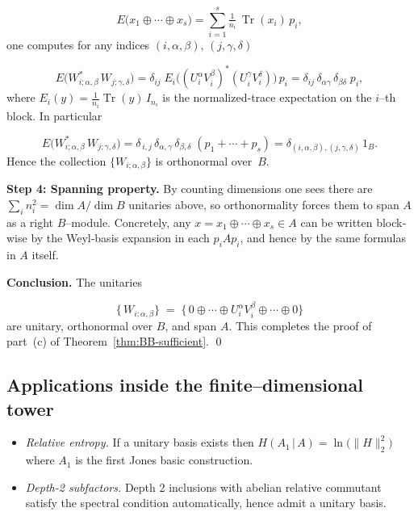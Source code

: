 \documentclass[11pt]{article}
\theoremstyle{mytheoremstyle}
\theoremstyle{definition}
\theoremstyle{remark}
\DeclareMathOperator{\Tr}{Tr}
\begin{document}
\[
  E\bigl(x_1\oplus\cdots\oplus x_s\bigr)
  =\sum_{i=1}^s\tfrac1{n_i}\,\Tr(x_i)\,p_i,
\]
one computes for any indices $(i,\alpha,\beta),\,(j,\gamma,\delta)$

\[
  E\bigl(W_{i;\alpha,\beta}^* \,W_{j;\gamma,\delta}\bigr)
  =\delta_{ij}\; 
  E_i\!\bigl((U_i^\alpha V_i^\beta)^* (U_i^\gamma V_i^\delta)\bigr)\,p_i
  =\delta_{ij}\,\delta_{\alpha\gamma}\,\delta_{\beta\delta}\;p_i,
\]
where
\( E_i(y)=\tfrac1{n_i}\Tr(y)\,I_{n_i} \)
is the normalized‐trace expectation on the $i$–th block.  In particular

\[
  E\bigl(W_{i;\alpha,\beta}^* \,W_{j;\gamma,\delta}\bigr)
  = \delta_{\,i,j}\,\delta_{\alpha,\gamma}\,\delta_{\beta,\delta}
    \;(p_1+\cdots+p_s)
  =\delta_{(i,\alpha,\beta),(j,\gamma,\delta)}\,1_B.
\]
Hence the collection $\{W_{i;\alpha,\beta}\}$ is orthonormal over~$B$.

\medskip
\noindent\textbf{Step 4: Spanning property.} By counting dimensions one sees there are
\( \sum_i n_i^2=\dim A/\dim B \) 
unitaries above, so orthonormality forces them to span $A$ as a right
$B$–module.  Concretely, any
$x=x_1\oplus\cdots\oplus x_s\in A$
can be written block‐wise by the Weyl‐basis expansion in each
$p_iAp_i$, and hence by the same formulas in $A$ itself.

\medskip
\noindent\textbf{Conclusion.}
The unitaries

\[
  \{\,W_{i;\alpha,\beta}\} \;=\; \{\,0\oplus\cdots\oplus U_i^\alpha V_i^\beta\oplus\cdots\oplus0\}
\]
are unitary, orthonormal over $B$, and span $A$.  This completes the proof
of part~\textup{(c)} of Theorem~\ref{thm:BB-sufficient}.
\qed


\newpage
\subsection*{Applications inside the finite–dimensional tower}
\begin{itemize}[leftmargin=1.8em]
  \item \emph{Relative entropy.}\; 
        If a unitary basis exists then
        \( H(A_1\,|\,A)=\ln\!\bigl(\|H\|_2^{2}\bigr) \)
        where $A_1$ is the first Jones basic construction.
  \item \emph{Depth-2 subfactors.}\; 
        Depth 2 inclusions with abelian relative commutant
        satisfy the spectral condition automatically,
        hence admit a unitary basis.
\end{itemize}
\end{document}
